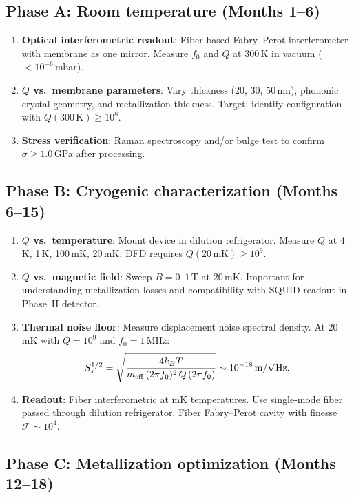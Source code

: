 \documentclass[11pt]{article}
\begin{document}
\subsection{Phase A: Room temperature (Months 1--6)}

\begin{enumerate}[nosep]
\item \textbf{Optical interferometric readout}: Fiber-based
  Fabry--Perot interferometer with membrane as one mirror.
  Measure $f_0$ and $Q$ at 300\,K in vacuum ($< 10^{-6}$\,mbar).
\item \textbf{$Q$ vs.\ membrane parameters}: Vary thickness (20, 30,
  50\,nm), phononic crystal geometry, and metallization thickness.
  Target: identify configuration with $Q(300\,\text{K}) \geq 10^8$.
\item \textbf{Stress verification}: Raman spectroscopy and/or
  bulge test to confirm $\sigma \geq 1.0$\,GPa after processing.
\end{enumerate}

\subsection{Phase B: Cryogenic characterization (Months 6--15)}

\begin{enumerate}[nosep]
\item \textbf{$Q$ vs.\ temperature}: Mount device in dilution
  refrigerator. Measure $Q$ at 4\,K, 1\,K, 100\,mK, 20\,mK.
  DFD requires $Q(20\,\text{mK}) \geq 10^9$.
\item \textbf{$Q$ vs.\ magnetic field}: Sweep $B = 0$--$1$\,T at
  20\,mK. Important for understanding metallization losses and
  compatibility with SQUID readout in Phase~II detector.
\item \textbf{Thermal noise floor}: Measure displacement noise spectral
  density. At 20\,mK with $Q = 10^9$ and $f_0 = 1$\,MHz:
  \begin{equation}
  S_x^{1/2} = \sqrt{\frac{4 k_B T}{m_{\rm eff}\,(2\pi f_0)^2\,Q\,(2\pi f_0)}}
  \sim 10^{-18}\,\text{m}/\sqrt{\text{Hz}}.
  \end{equation}
\item \textbf{Readout}: Fiber interferometric at mK temperatures.
  Use single-mode fiber passed through dilution refrigerator.
  Fiber Fabry--Perot cavity with finesse $\mathcal{F} \sim 10^4$.
\end{enumerate}

\subsection{Phase C: Metallization optimization (Months 12--18)}
\end{document}
